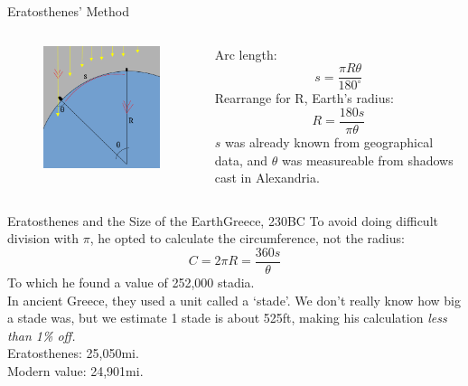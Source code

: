 \documentclass[12pt]{beamer}
\begin{document}
        \begin{frame}{Eratosthenes' Method}
            \begin{columns}
                \begin{column}{0.5\linewidth}
                    \begin{figure}
                        \includegraphics[scale=0.4, frame]{earthdiam.png}
                    \end{figure}
                \end{column}
                \begin{column}{0.5\linewidth}
                    Arc length:\\
                    \[s=\frac{{\pi}R\theta}{180^\circ}\]
                    Rearrange for R, Earth's radius:\\
                    \[R=\frac{180s}{\pi\theta}\]
                    $s$ was already known from geographical data, and $\theta$ was measureable from shadows cast in Alexandria.
                \end{column}
            \end{columns}
        \end{frame}
        \begin{frame}{Eratosthenes and the Size of the Earth}{Greece, 230BC} \centering
            To avoid doing difficult division with $\pi$, he opted to calculate the circumference, not the radius:
            \[C=2{\pi}R=\frac{360s}{\theta}\]
            To which he found a value of 252,000 stadia.\\
            In ancient Greece, they used a unit called a `stade'. We don't really know how big a stade was, but we estimate 1 stade is about 525ft, making his calculation \textit{less than 1\% off.}\\ \vspace{1em}
            Eratosthenes: 25,050mi.\\
            Modern value: 24,901mi.
        \end{frame}
\end{document}
